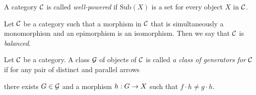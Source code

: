\begin{definition}
A category ${\mathcal C}$ is called \textit{well-powered} if $\mathrm{Sub}(X)$ is a set for every object $X$ in ${\mathcal C}$.
\end{definition}

\begin{definition}
Let ${\mathcal C}$ be a category such that a morphism in ${\mathcal C}$ that is simultaneously a monomorphism and an epimorphism is an isomorphism. Then we say that ${\mathcal C}$ is \textit{balanced}.
\end{definition}

\begin{definition}
Let ${\mathcal C}$ be a category. A class ${\mathcal G}$ of objects of ${\mathcal C}$ is called \textit{a class of generators for ${\mathcal C}$} if for any pair of distinct and parallel arrows 
\begin{center}
\end{center}
there exists $G\in {\mathcal G}$ and a morphism $h:G\rightarrow X$ such that $f\cdot h\neq g\cdot h$.
\end{definition}

